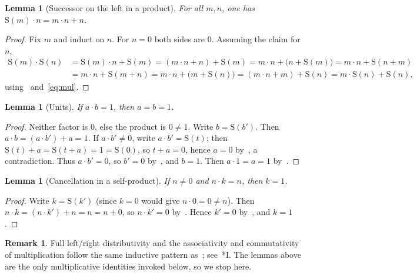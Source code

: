\documentclass[11pt,reqno]{amsart}
\theoremstyle{plain}
\newtheorem{lemma}[theorem]{Lemma}
\theoremstyle{definition}
\newtheorem{remark}[theorem]{Remark}
\theoremstyle{remark}
\newcommand{\Suc}{\mathrm{S}}
\numberwithin{equation}{section}
\begin{document}
\begin{lemma}[Successor on the left in a product]
\label{lem:mul-succ-left}
For all \(m,n\), one has \(\Suc(m)\cdot n = m\cdot n + n\).
\end{lemma}

\begin{proof}
Fix \(m\) and induct on \(n\). For \(n=0\) both sides are \(0\). Assuming
the claim for \(n\),
\begin{align*}
  \Suc(m)\cdot\Suc(n)
    &= \Suc(m)\cdot n + \Suc(m)
     = (m\cdot n + n) + \Suc(m)
     = m\cdot n + \bigl(n+\Suc(m)\bigr)
     = m\cdot n + \Suc(n+m)\\
    &= m\cdot n + \Suc(m+n)
     = m\cdot n + \bigl(m+\Suc(n)\bigr)
     = (m\cdot n + m) + \Suc(n)
     = m\cdot\Suc(n) + \Suc(n),
\end{align*}
using~ and~\eqref{eq:mul}.
\end{proof}

\begin{lemma}[Units]
\label{lem:units}
If \(a\cdot b=1\), then \(a=b=1\).
\end{lemma}

\begin{proof}
Neither factor is \(0\), else the product is \(0\neq 1\). Write
\(b=\Suc(b')\). Then \(a\cdot b = (a\cdot b')+a = 1\). If
\(a\cdot b'\neq 0\), write \(a\cdot b'=\Suc(t)\); then
\(\Suc(t)+a=\Suc(t+a)=1=\Suc(0)\), so \(t+a=0\), hence \(a=0\)
by~, a contradiction. Thus \(a\cdot b'=0\), so
\(b'=0\) by~, and \(b=1\). Then
\(a\cdot 1=a=1\) by~.
\end{proof}

\begin{lemma}[Cancellation in a self-product]
\label{lem:mul-eq-self}
If \(n\neq 0\) and \(n\cdot k=n\), then \(k=1\).
\end{lemma}

\begin{proof}
Write \(k=\Suc(k')\) (since \(k=0\) would give \(n\cdot 0=0\neq n\)).
Then \(n\cdot k=(n\cdot k')+n=n=n+0\), so \(n\cdot k'=0\)
by~. Hence \(k'=0\) by~,
and \(k=1\).
\end{proof}

\begin{remark}
\label{rem:further-arith}
Full left/right distributivity and the associativity and commutativity
of multiplication follow the same inductive pattern
as~; see~\cite{Landau1951}*{I}. The
lemmas above are the only multiplicative identities invoked below, so we
stop here.
\end{remark}
\end{document}

